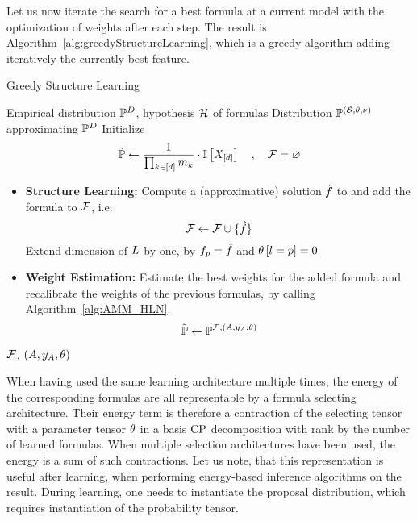
Let us now iterate the search for a best formula at a current model with the optimization of weights after each step.
The result is Algorithm~\ref{alg:greedyStructureLearning}, which is a greedy algorithm adding iteratively the currently best feature.

\begin{algorithm}[hbt!]
    \caption{Greedy Structure Learning}\label{alg:greedyStructureLearning}
    \begin{algorithmic}
        \Require Empirical distribution $\mathbb{P}^{D}$, hypothesis $\mathcal{H}$ of formulas
        \Ensure Distribution $\mathbb{P}^{(\mathcal{S},\theta,\nu)}$ approximating $\mathbb{P}^{D}$
        \iosepline
        \State Initialize
        \[ \tilde{\mathbb{P}} \leftarrow \frac{1}{\prod_{k\in[d]}m_{k}} \cdot \mathbb{I}\left[X_{[d]}\right] \quad, \quad \mathcal{F} = \varnothing \]
            \State
            \begin{itemize}
                \item \textbf{Structure Learning:} Compute a (approximative) solution $\hat{f}$ to  and add the formula to $\mathcal{F}$, i.e.
                \[ \mathcal{F} \leftarrow \mathcal{F} \cup\{\hat{f}\} \]
                Extend dimension of $L$ by one, by $f_{p}=\hat{f}$ and $\theta\left[l=p\right]=0$
                \item \textbf{Weight Estimation:} Estimate the best weights for the added formula and recalibrate the weights of the previous formulas, by calling Algorithm~\ref{alg:AMM_HLN}.
                \[ \tilde{\mathbb{P}} \leftarrow \mathbb{P}^{\mathcal{F},(A,y_{A},\theta)} \]
            \end{itemize}
        \EndWhile
        \State \Return $\mathcal{F}$, $(A,y_{A},\theta)$ %
    \end{algorithmic}
\end{algorithm}


When having used the same learning architecture multiple times, the energy of the corresponding formulas are all representable by a formula selecting architecture.
Their energy term is therefore a contraction of the selecting tensor with a parameter tensor $\theta$ in a basis $\mathrm{CP}$ decomposition with rank by the number of learned formulas.
When multiple selection architectures have been used, the energy is a sum of such contractions.
% 
Let us note, that this representation is useful after learning, when performing energy-based inference algorithms on the result.
During learning, one needs to instantiate the proposal distribution, which requires instantiation of the probability tensor.


